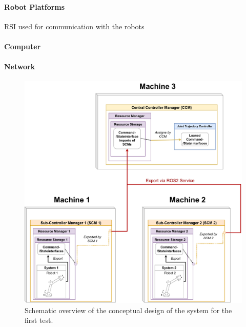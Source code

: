 \paragraph{Robot Platforms}
RSI used for communication with the robots
\paragraph{Computer}
\paragraph{Network}
\begin{figure}[htbp]
	\centering
	\includegraphics[width=1\textwidth]{Figures/c6/test_scenario_1.drawio.pdf}
	\caption{Schematic overview of the conceptual design of the system for the first test.}
	\label{c6_fig_test_scenario_1}
\end{figure}
